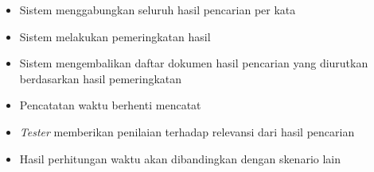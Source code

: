 \begin{enumerate}
\begin{itemize}
{        output berupa hasil pencarian}
      \item{Sistem menggabungkan seluruh hasil pencarian per kata}
      \item{Sistem melakukan pemeringkatan hasil}
      \item{Sistem mengembalikan daftar dokumen hasil pencarian yang diurutkan
        berdasarkan hasil pemeringkatan}
      \item{Pencatatan waktu berhenti mencatat}
      \item{\textit{Tester} memberikan penilaian terhadap relevansi dari hasil
        pencarian}
      \item{Hasil perhitungan waktu akan dibandingkan dengan skenario lain}
    \end{itemize}
\end{enumerate}
